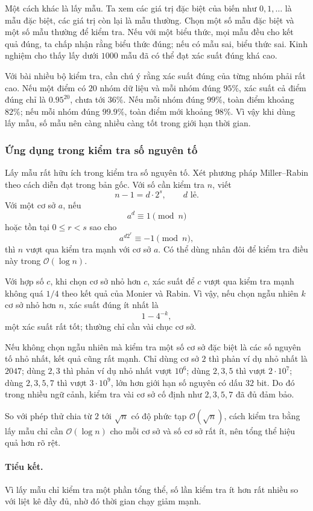 \documentclass[11pt]{article}
\newcommand{\Oh}{\mathcal{O}}
\begin{document}
Một cách khác là lấy mẫu. Ta xem các giá trị đặc biệt của biến như $0,1,\ldots$
là mẫu đặc biệt, các giá trị còn lại là mẫu thường. Chọn một số mẫu đặc biệt
và một số mẫu thường để kiểm tra. Nếu với một biểu thức, mọi mẫu đều cho kết
quả đúng, ta chấp nhận rằng biểu thức đúng; nếu có mẫu sai, biểu thức sai.
Kinh nghiệm cho thấy lấy dưới $1000$ mẫu đã có thể đạt xác suất đúng khá cao.

Với bài nhiều bộ kiểm tra, cần chú ý rằng xác suất đúng của từng nhóm phải rất
cao. Nếu một điểm có $20$ nhóm dữ liệu và mỗi nhóm đúng $95\%$, xác suất cả
điểm đúng chỉ là $0.95^{20}$, chưa tới $36\%$. Nếu mỗi nhóm đúng $99\%$, toàn
điểm khoảng $82\%$; nếu mỗi nhóm đúng $99.9\%$, toàn điểm mới khoảng $98\%$.
Vì vậy khi dùng lấy mẫu, số mẫu nên càng nhiều càng tốt trong giới hạn thời
gian.

\subsubsection{Ứng dụng trong kiểm tra số nguyên tố}

Lấy mẫu rất hữu ích trong kiểm tra số nguyên tố. Xét phương pháp Miller--Rabin
theo cách diễn đạt trong bản gốc. Với số cần kiểm tra $n$, viết
\[
  n-1=d\cdot 2^s,\qquad d\text{ lẻ}.
\]
Với một cơ sở $a$, nếu
\[
  a^d\equiv 1 \pmod n
\]
hoặc tồn tại $0\le r<s$ sao cho
\[
  a^{d2^r}\equiv -1 \pmod n,
\]
thì $n$ vượt qua kiểm tra mạnh với cơ sở $a$. Có thể dùng nhân đôi để kiểm tra
điều này trong $\Oh(\log n)$.

Với hợp số $c$, khi chọn cơ sở nhỏ hơn $c$, xác suất để $c$ vượt qua kiểm tra
mạnh không quá $1/4$ theo kết quả của Monier và Rabin. Vì vậy, nếu chọn ngẫu
nhiên $k$ cơ sở nhỏ hơn $n$, xác suất đúng ít nhất là
\[
  1-4^{-k},
\]
một xác suất rất tốt; thường chỉ cần vài chục cơ sở.

Nếu không chọn ngẫu nhiên mà kiểm tra một số cơ sở đặc biệt là các số nguyên
tố nhỏ nhất, kết quả cũng rất mạnh. Chỉ dùng cơ sở $2$ thì phản ví dụ nhỏ nhất
là $2047$; dùng $2,3$ thì phản ví dụ nhỏ nhất vượt $10^6$; dùng $2,3,5$ thì
vượt $2\cdot10^7$; dùng $2,3,5,7$ thì vượt $3\cdot10^9$, lớn hơn giới hạn số
nguyên có dấu $32$ bit. Do đó trong nhiều ngữ cảnh, kiểm tra vài cơ sở cố định
như $2,3,5,7$ đã đủ đảm bảo.

So với phép thử chia từ $2$ tới $\sqrt n$ có độ phức tạp $\Oh(\sqrt n)$, cách
kiểm tra bằng lấy mẫu chỉ cần $\Oh(\log n)$ cho mỗi cơ sở và số cơ sở rất ít,
nên tổng thể hiệu quả hơn rõ rệt.

\paragraph{Tiểu kết.}
Vì lấy mẫu chỉ kiểm tra một phần tổng thể, số lần kiểm tra ít hơn rất nhiều so
với liệt kê đầy đủ, nhờ đó thời gian chạy giảm mạnh.
\end{document}
